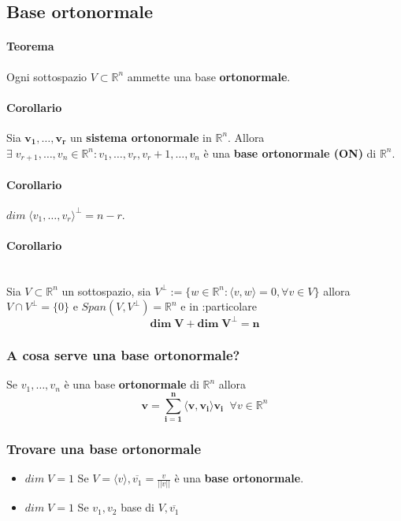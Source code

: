 \documentclass[a4paper, 12pt]{report}
\begin{document}
        \subsection{Base ortonormale}
        \paragraph{Teorema} Ogni sottospazio $V \subset \mathbb{R}^n$ ammette una base \textbf{ortonormale}.
        \paragraph{Corollario} Sia $\boldsymbol{v_1,\dots,v_r}$ un \textbf{sistema ortonormale} in $\mathbb{R}^n$. Allora\\
        $\exists \; v_{r+1},\dots,v_n \in \mathbb{R}^n: v_1,\dots,v_r,v_r+1,\dots,v_n$ è una \textbf{base ortonormale (ON)} di $\mathbb{R}^n$.
        \paragraph{Corollario} $dim \; \langle v_1,\dots,v_r \rangle^\perp = n-r$.
        \paragraph{Corollario} \mbox{}\\
        Sia $V \subset \mathbb{R}^n$ un sottospazio, sia $V^\perp:=\{w \in \mathbb{R}^n: \langle v,w \rangle=0, \forall v \in V\}$
        allora $V \cap V^\perp=\{0\}$ e $Span(V,V^\perp)=\mathbb{R}^n$ e in :particolare $$\boldsymbol{dim \; V+ dim \; V^\perp=n}$$
        \subsubsection{A cosa serve una base ortonormale?}
        Se $v_1,\dots,v_n$ è una base \textbf{ortonormale} di $\mathbb{R}^n$ allora $$\boldsymbol{v=\sum^n_{i=1} \langle v,v_i \rangle v_i} \; \; \forall v \in \mathbb{R}^n$$
        \subsubsection{Trovare una base ortonormale}
        \begin{itemize}
            \item $dim \; V=1$ Se $V=\langle v \rangle, \overline{v_1}=\frac{v}{||v||}$ è una \textbf{base ortonormale}.
            \item $dim \; V=1$ Se $v_1,v_2$ base di $V, \overline{v_1}$
        \end{itemize}
\end{document}
